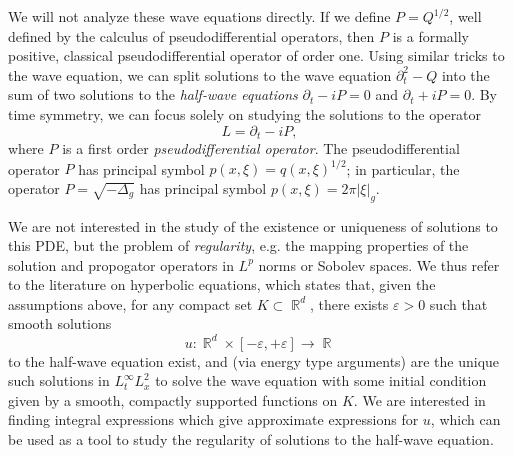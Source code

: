 \documentclass{article}
\theoremstyle{plain}
\theoremstyle{remark}
\theoremstyle{definition}
\DeclareMathOperator{\RR}{\mathbb{R}}
\begin{document}
We will not analyze these wave equations directly. If we define $P = Q^{1/2}$, well defined by the calculus of pseudodifferential operators, then $P$ is a formally positive, classical pseudodifferential operator of order one. Using similar tricks to the wave equation, we can split solutions to the wave equation $\partial_t^2 - Q$ into the sum of two solutions to the \emph{half-wave equations} $\partial_t - i P = 0$ and $\partial_t + i P = 0$. By time symmetry, we can focus solely on studying the solutions to the operator
%
\[ L = \partial_t - i P, \]
%
where $P$ is a first order \emph{pseudodifferential operator}. The pseudodifferential operator $P$ has principal symbol $p(x,\xi) = q(x,\xi)^{1/2}$; in particular, the operator $P = \sqrt{-\Delta_g}$ has principal symbol $p(x,\xi) = 2 \pi |\xi|_g$.

We are not interested in the study of the existence or uniqueness of solutions to this PDE, but the problem of \emph{regularity}, e.g. the mapping properties of the solution and propogator operators in $L^p$ norms or Sobolev spaces. We thus refer to the literature on hyperbolic equations, which states that, given the assumptions above, for any compact set $K \subset \RR^d$, there exists $\varepsilon > 0$ such that smooth solutions
%
\[ u: \RR^d \times [-\varepsilon,+\varepsilon] \to \RR \]
%
to the half-wave equation exist, and (via energy type arguments) are the unique such solutions in $L^\infty_t L^2_x$ to solve the wave equation with some initial condition given by a smooth, compactly supported functions on $K$. We are interested in finding integral expressions which give approximate expressions for $u$, which can be used as a tool to study the regularity of solutions to the half-wave equation.

\begin{comment}
For such an operator, we can find a countable, orthogonal basis $\{ e_\lambda : \lambda \geq 0 \}$ of $L^2(M)$, such that $Pe_\lambda = \lambda e_\lambda$, and such that for each $\lambda$, $e_\lambda$ is a smooth function, with $L^2_s$ norm $O_s(\lambda^s)$. The number of elements of this basis with eigenvalue at most $\lambda$ is $O(1 + \lambda^d)$. Given this basis, we can define a family of bounded operators $\{ e^{2 \pi itP} \}$ on $L^2(M)$ by setting $e^{2 \pi it P} e_\lambda = e^{2 \pi it \lambda} e_\lambda$, and then consider a solution operator
%
\[ (Wf)(x,t) = (e^{2 \pi it \lambda} f)(x). \]
%
Using the $L^2_s$ norm properties of the eigenfunctions $\{ e_\lambda \}$, and the fact that for any $f \in C^\infty(M)$,
%
\[ \langle f, e_\lambda \rangle \lesssim_N \lambda^{-N} \quad\text{for all $N > 0$,} \]
%
it is simple to check that $W$ maps $C^\infty(M)$ into $C^\infty_{\text{loc}}(M \times \RR)$, and that for $f \in C^\infty(M)$, the smooth function $u = Wf$ solves the equation $Lu = 0$ with initial conditions $f$. One can also prove the uniqueness of solution solutions, e.g. using energy estimates, but this takes us a little far afield of what we want to talk about in these notes.
\end{comment}
\end{document}
